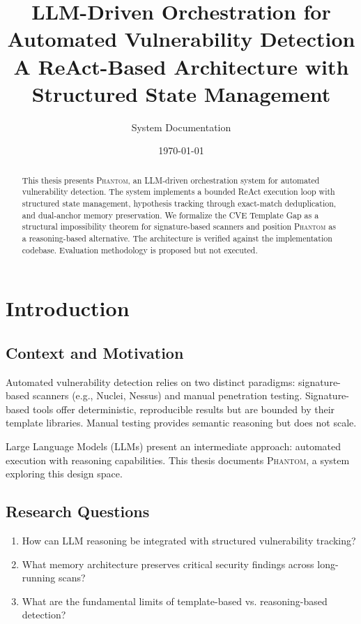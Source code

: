 \documentclass[11pt,a4paper]{article}
\title{\textbf{LLM-Driven Orchestration for Automated Vulnerability Detection}\\\vspace{0.3em}
\large A ReAct-Based Architecture with Structured State Management}
\author{System Documentation}
\date{\today}
\theoremstyle{definition}
\newcommand{\phantom}{\textsc{Phantom}}
\begin{document}
\maketitle
\thispagestyle{empty}

\vspace{2em}
\begin{abstract}
\noindent
This thesis presents \phantom{}, an LLM-driven orchestration system for automated vulnerability detection. The system implements a bounded ReAct execution loop with structured state management, hypothesis tracking through exact-match deduplication, and dual-anchor memory preservation. We formalize the CVE Template Gap as a structural impossibility theorem for signature-based scanners and position \phantom{} as a reasoning-based alternative. The architecture is verified against the implementation codebase. Evaluation methodology is proposed but not executed.
\end{abstract}

\tableofcontents
\newpage

\section{Introduction}
\label{sec:introduction}

\subsection{Context and Motivation}

Automated vulnerability detection relies on two distinct paradigms: signature-based scanners (e.g., Nuclei, Nessus) and manual penetration testing. Signature-based tools offer deterministic, reproducible results but are bounded by their template libraries. Manual testing provides semantic reasoning but does not scale.

Large Language Models (LLMs) present an intermediate approach: automated execution with reasoning capabilities. This thesis documents \phantom{}, a system exploring this design space.

\subsection{Research Questions}

\begin{enumerate}[label=\textbf{RQ\arabic*:}, leftmargin=2em]
    \item How can LLM reasoning be integrated with structured vulnerability tracking?
    \item What memory architecture preserves critical security findings across long-running scans?
    \item What are the fundamental limits of template-based vs. reasoning-based detection?
\end{enumerate}
\end{document}
